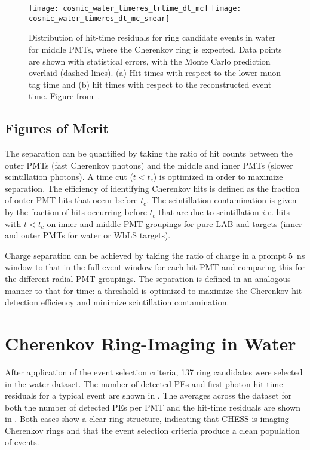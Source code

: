 \begin{figure}
	\centering
	\texttt{[image: cosmic\_water\_timeres\_trtime\_dt\_mc]}
	\texttt{[image: cosmic\_water\_timeres\_dt\_mc\_smear]}
	\caption{Distribution of hit-time residuals for ring candidate events in water for middle PMTs, where the Cherenkov ring is expected. Data points are shown with statistical errors, with the Monte Carlo prediction overlaid (dashed lines). 
	(a) Hit times with respect to the lower muon tag time and (b) hit times with respect to the reconstructed event time.
	Figure from~\cite{chess_nim}.}
	\label{f:smear}
\end{figure}

\subsection{Figures of Merit}

The separation can be quantified by taking the ratio of hit counts between the outer PMTs (fast Cherenkov photons) and the middle and inner PMTs (slower scintillation photons).  
A time cut ($t < t_c$) is optimized in order to maximize separation.  
The efficiency of identifying Cherenkov hits is defined as the fraction of outer PMT hits that occur before $t_c$.  
The scintillation contamination  is given by the fraction of hits occurring before $t_c$ that are due to scintillation \textit{i.e.} hits with $t < t_c$ on inner and middle PMT groupings for pure LAB and {\labppo} targets (inner and outer PMTs for water or WbLS targets). 

Charge separation can be achieved by taking the ratio of charge in a prompt 5~ns window to that in the full event window for each hit PMT and comparing this for the different radial PMT groupings.  
The separation is defined in an analogous manner to that for time: a threshold is optimized to maximize the Cherenkov hit detection efficiency and minimize scintillation contamination.  

\clearpage

\section{Cherenkov Ring-Imaging in Water}

\label{sec:water}

After application of the event selection criteria, 137 ring candidates were selected in the water dataset.
The number of detected PEs and first photon hit-time residuals for a typical event are shown in . 
The averages across the dataset for both the number of detected PEs per PMT and the hit-time residuals are shown in .
Both cases show a clear ring structure, indicating that CHESS is imaging Cherenkov rings and that the event selection criteria produce a clean population of events. 


